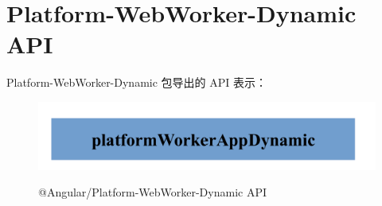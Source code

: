 \section{Platform-WebWorker-Dynamic API}


Platform-WebWorker-Dynamic 包导出的 API 表示：

\begin{figure}[!hbt]
  \centering
  \caption{@Angular/Platform-WebWorker-Dynamic API}
  \includegraphics[width=0.75\linewidth]{12_the_platform_webworker_dynamic_package/platform_webworker_dynamic_api}
  \label{fig:platform_webworker_dynamic_api}
\end{figure}
